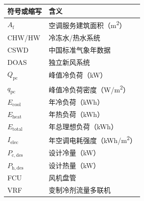 \begin{tabular}{ll}
\toprule
符号或缩写 & 含义 \\
\midrule
$A_{\mathrm{f}}$ & 空调服务建筑面积（\si{m^2}） \\
CHW/HW & 冷冻水/热水系统 \\
CSWD & 中国标准气象年数据 \\
DOAS & 独立新风系统 \\
$Q_{\mathrm{pc}}$ & 峰值冷负荷（\si{kW}） \\
$q_{\mathrm{pc}}$ & 峰值冷负荷密度（\si{W/m^2}） \\
$E_{\mathrm{cool}}$ & 年冷负荷（\si{kWh}） \\
$E_{\mathrm{heat}}$ & 年热负荷（\si{kWh}） \\
$E_{\mathrm{total}}$ & 年总理想负荷（\si{kWh}） \\
$I_{\mathrm{elec}}$ & 年空调电耗强度（\si{kWh/m^2}） \\
$P_{\mathrm{c,des}}$ & 设计冷量（\si{kW}） \\
$P_{\mathrm{h,des}}$ & 设计热量（\si{kW}） \\
FCU & 风机盘管 \\
VRF & 变制冷剂流量多联机 \\
\bottomrule
\end{tabular}
